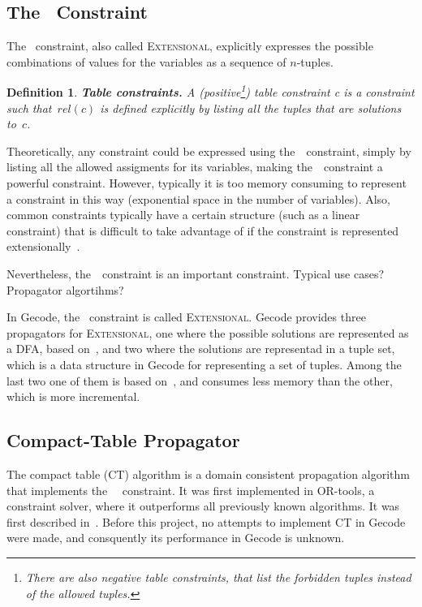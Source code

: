 \documentclass[a4paper,11pt]{article}
\newtheorem{definition}{Definition}
\newcommand{\Todo}[1]{{\color{blue}#1}}
\newcommand{\Table}{\Constraint{Table}~}
\newcommand{\Extensional}{\Constraint{Extensional}~}
\def\Extensional{\textsc{Extensional}}
\newcommand{\CTpaper}[0]{DBLP:conf/cp/DemeulenaereHLP16}
\numberwithin{equation}{section}
\begin{document}
\subsection{The \Table Constraint}
\label{bg:table}
The \Table constraint, also called \Extensional,
explicitly expresses the possible combinations of values for the variables as a
sequence of $n$-tuples.

\begin{definition}
  \textbf{Table constraints.} A
  (positive\footnote{There are also negative table constraints, that list the forbidden tuples instead of the allowed tuples.})
  \emph{table constraint c} is a
  constraint such that~$rel(c)$ is defined explicitly by listing all the
  tuples that are solutions to~$c$.
\end{definition}

Theoretically, any constraint could be expressed using the~\Table constraint,
simply by listing all the allowed assigments for its variables, 
making the~\Table constraint a powerful constraint. However, typically
it is too memory consuming to represent a constraint in this way
(exponential space in the number of variables). Also, common constraints
typically have a certain structure (such as a linear constraint)
that is difficult to take advantage of if the constraint is represented
extensionally~\cite{SchulteCarlsson:FDsys}.

Nevertheless, the~\Table constraint is an important constraint.
\Todo{Typical use cases? Propagator algortihms?}

In Gecode, the \Table constraint is called \Extensional. Gecode provides
three propagators for \Extensional, one where the possible solutions are
represented as a DFA, based on~\cite{Pesant:seqs}, and two where the solutions
are representad in a tuple set, which is a data structure in Gecode for representing 
a set of tuples. Among the last two one of them is based 
on~\cite{DBLP:journals/ai/BessiereRYZ05}, and consumes less memory than the
other, which is more incremental. 


\subsection{Compact-Table Propagator}
\label{bg:ct}
The compact table (CT) algorithm is a domain consistent propagation algorithm
that implements the \Table~constraint. It was first implemented in
OR-tools, a constraint solver, where it outperforms all previously
known algorithms. It was first described in~\cite{\CTpaper}.
Before this project, no attempts to implement CT in Gecode were made,
and consquently its performance in Gecode is unknown.
\end{document}
